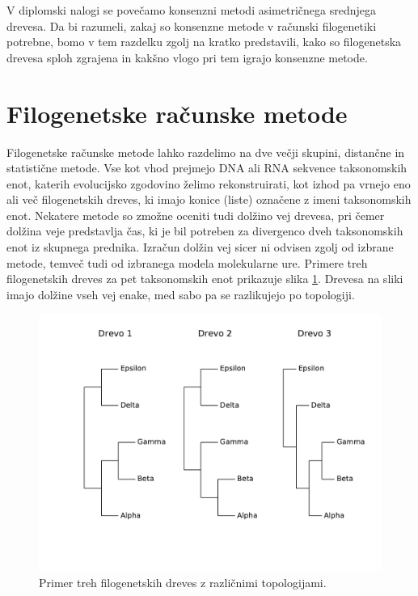 \documentclass[a4paper, 12pt]{book}
\begin{document}
V diplomski nalogi se povečamo konsenzni metodi asimetričnega srednjega drevesa. Da bi 
razumeli, zakaj so konsenzne metode v računski filogenetiki potrebne, bomo v tem 
razdelku zgolj na kratko predstavili, kako so filogenetska drevesa sploh zgrajena in 
kakšno vlogo pri tem igrajo konsenzne metode. 

\section{Filogenetske računske metode}

Filogenetske računske metode lahko razdelimo na dve večji skupini, distančne in
statistične metode. Vse kot vhod prejmejo DNA ali RNA sekvence taksonomskih enot, 
katerih evolucijsko zgodovino želimo rekonstruirati, kot izhod pa vrnejo eno ali
več filogenetskih dreves, ki imajo konice (liste) označene z imeni taksonomskih enot.
Nekatere metode so zmožne oceniti tudi dolžino vej drevesa, pri čemer dolžina veje
predstavlja čas, ki je bil potreben za divergenco dveh taksonomskih enot iz skupnega
prednika. Izračun dolžin vej sicer ni odvisen zgolj od izbrane metode, temveč tudi 
od izbranega modela molekularne ure. Primere treh filogenetskih dreves za pet 
taksonomskih enot prikazuje slika \ref{img-input-trees}. Drevesa na sliki imajo 
dolžine vseh vej enake, med sabo pa se razlikujejo po topologiji.

\begin{figure}
	\begin{center}
		\includegraphics[scale=0.7, clip=true, trim=0 3cm 0 9mm]{gfx/input_trees_ex.pdf}
	\end{center}
	\caption{Primer treh filogenetskih dreves z različnimi topologijami.}
	\label{img-input-trees}
\end{figure}
\end{document}
